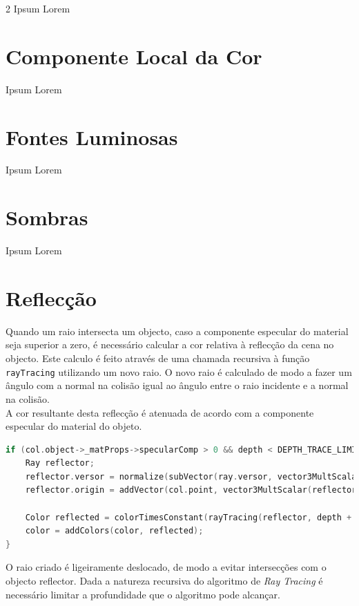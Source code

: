 \documentclass{article}
\begin{document}
\begin{multicols}{2}
    Ipsum Lorem

    \section{Componente Local da Cor}

    Ipsum Lorem

    \section{Fontes Luminosas}

    Ipsum Lorem

    \section{Sombras}

    Ipsum Lorem

    \section{Reflecção}

    Quando um raio intersecta um objecto, caso a componente especular do material
    seja superior a zero, é necessário calcular a cor relativa à reflecção da
    cena no objecto. Este calculo é feito através de uma chamada recursiva à função
    \verb|rayTracing| utilizando um novo raio. O novo raio é calculado de modo
    a fazer um ângulo com a normal na colisão igual ao ângulo entre o raio incidente
    e a normal na colisão. \\
    A cor resultante desta reflecção é atenuada de acordo com a componente especular
    do material do objeto.

    \begin{lstlisting}[language=C++]
if (col.object->_matProps->specularComp > 0 && depth < DEPTH_TRACE_LIMIT) {
    Ray reflector;
    reflector.versor = normalize(subVector(ray.versor, vector3MultScalar(col.normal, 2 * internalProduct(ray.versor, col.normal))));
    reflector.origin = addVector(col.point, vector3MultScalar(reflector.versor, EPSILON));

    Color reflected = colorTimesConstant(rayTracing(reflector, depth + 1, RefrIndex), col.object->_matProps->specularComp);
    color = addColors(color, reflected);
}
    \end{lstlisting}

    O raio criado é ligeiramente deslocado, de modo a evitar intersecções com o objecto reflector. Dada a natureza recursiva do algoritmo de \textit{Ray Tracing} é necessário
    limitar a profundidade que o algoritmo pode alcançar.


\end{multicols}
\end{document}
